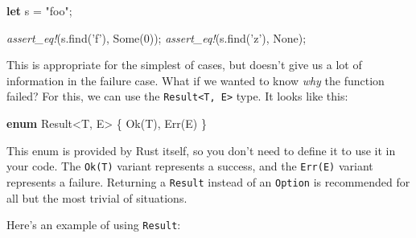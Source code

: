 \documentclass[a4paper,]{book}
\newenvironment{Shaded}{\begin{snugshade}}{\end{snugshade}}
\newcommand{\KeywordTok}[1]{\textcolor[rgb]{0.13,0.29,0.53}{\textbf{{#1}}}}
\newcommand{\DataTypeTok}[1]{\textcolor[rgb]{0.13,0.29,0.53}{{#1}}}
\newcommand{\DecValTok}[1]{\textcolor[rgb]{0.00,0.00,0.81}{{#1}}}
\newcommand{\ConstantTok}[1]{\textcolor[rgb]{0.00,0.00,0.00}{{#1}}}
\newcommand{\CharTok}[1]{\textcolor[rgb]{0.31,0.60,0.02}{{#1}}}
\newcommand{\StringTok}[1]{\textcolor[rgb]{0.31,0.60,0.02}{{#1}}}
\newcommand{\PreprocessorTok}[1]{\textcolor[rgb]{0.56,0.35,0.01}{\textit{{#1}}}}
\newcommand{\NormalTok}[1]{{#1}}
\begin{document}
\begin{Shaded}
\begin{Highlighting}[]
\KeywordTok{let} \NormalTok{s = }\StringTok{"foo"}\NormalTok{;}

\PreprocessorTok{assert_eq!}\NormalTok{(s.find(}\CharTok{'f'}\NormalTok{), }\ConstantTok{Some}\NormalTok{(}\DecValTok{0}\NormalTok{));}
\PreprocessorTok{assert_eq!}\NormalTok{(s.find(}\CharTok{'z'}\NormalTok{), }\ConstantTok{None}\NormalTok{);}
\end{Highlighting}
\end{Shaded}

This is appropriate for the simplest of cases, but doesn't give us a lot
of information in the failure case. What if we wanted to know \emph{why}
the function failed? For this, we can use the
\texttt{Result\textless{}T,\ E\textgreater{}} type. It looks like this:

\begin{Shaded}
\begin{Highlighting}[]
\KeywordTok{enum} \DataTypeTok{Result}\NormalTok{<T, E> \{}
   \ConstantTok{Ok}\NormalTok{(T),}
   \ConstantTok{Err}\NormalTok{(E)}
\NormalTok{\}}
\end{Highlighting}
\end{Shaded}

This enum is provided by Rust itself, so you don't need to define it to
use it in your code. The \texttt{Ok(T)} variant represents a success,
and the \texttt{Err(E)} variant represents a failure. Returning a
\texttt{Result} instead of an \texttt{Option} is recommended for all but
the most trivial of situations.

Here's an example of using \texttt{Result}:
\end{document}

